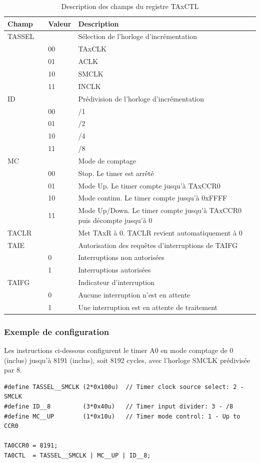 \begin{table}[h]
\centering 
\begin{tabular}{l l l l}
\hline\hline
Champ & & Valeur & Description \\ %
\hline
TASSEL & & & Sélection de l'horloge d'incrémentation  \\
& & 00 & TAxCLK  \\
& & 01 & ACLK  \\
& & 10 & SMCLK  \\
& & 11 & INCLK  \\
\hline
ID & & & Prédivision de l'horloge d'incrémentation  \\
& & 00 & /1  \\
& & 01 & /2  \\
& & 10 & /4  \\
& & 11 & /8  \\
\hline
MC & & & Mode de comptage  \\
& & 00 & Stop. Le timer est arrêté  \\
& & 01 & Mode Up. Le timer compte jusqu'à TAxCCR0  \\
& & 10 & Mode continu. Le timer compte jusqu'à 0xFFFF  \\
& & 11 & Mode Up/Down. Le timer compte jusqu'à TAxCCR0 puis décompte jusqu'à 0  \\
\hline
TACLR & & & Met TAxR à 0. TACLR revient automatiquement à 0 \\
\hline
TAIE & & & Autorisation des requêtes d'interruptions de TAIFG \\
& & 0 & Interruptions non autorisées \\
& & 1 & Interruptions autorisées \\
\hline
TAIFG & & & Indicateur d'interruption \\
& & 0 & Aucune interruption n'est en attente \\
& & 1 & Une interruption est en attente de traitement \\
\hline
\end{tabular}
\caption{Description des champs du registre TAxCTL}
\label{table:TAxCTL}
\end{table}

\begin{minipage}{14cm}{
\subsubsection*{Exemple de configuration}
Les instructions ci-dessous configurent le timer A0 en mode comptage de 0 (inclus) jusqu'à 8191 (inclus), soit 8192 cycles, avec l'horloge SMCLK prédivisée par 8.

\lstset{style=customc}
\begin{lstlisting}
#define TASSEL__SMCLK (2*0x100u)  // Timer clock source select: 2 - SMCLK
#define ID__8         (3*0x40u)   // Timer input divider: 3 - /8
#define MC__UP        (1*0x10u)   // Timer mode control: 1 - Up to CCR0

TA0CCR0 = 8191;
TA0CTL  = TASSEL__SMCLK | MC__UP | ID__8;
\end{lstlisting}
}
\end{minipage}

